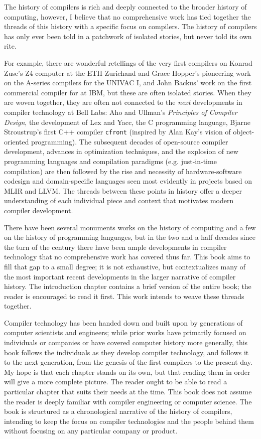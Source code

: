 
The history of compilers is rich and deeply connected to the broader history of
computing, however, I believe that no comprehensive work has tied together the
threads of this history with a specific focus on compilers.
The history of compilers has only ever been told in a patchwork of isolated stories,
but never told its own rite.

For example, there are wonderful
retellings of the very first compilers on Konrad Zuse's Z4 computer at the ETH
Zurichand and Grace Hopper's pioneering work on the A-series compilers for the
UNIVAC I, and John Backus' work on the first commercial compiler for \FTN{}
at IBM, but these are often isolated stories. When they are woven together, they
are often not connected to the \textit{next}
developments in compiler technology at Bell Labs: Aho and Ullman's
\textit{Principles of Compiler Design}, the development of Lex and Yacc, the C
programming language, Bjarne Stroustrup's first C++ compiler \texttt{cfront}
(inspired by Alan Kay's vision of object-oriented programming). The subsequent
decades of open-source compiler development, advances in optimization
techniques, and the explosion of new programming languages and compilation
paradigms (e.g. just-in-time compilation) are then followed by the rise and
necessity of hardware-software codesign and domain-specific languages seen most
evidently in projects based on MLIR and LLVM. The threads between these points
in history offer a deeper understanding of each individual piece and context
that motivates modern compiler development.

There have been several
monuments works on the history of computing and a few on the history of
programming languages, but in the two and a half decades since the turn of the
century there have been ample developments in compiler technology that no
comprehensive work has covered thus far. This book aims to fill that gap to a
small degree; it is not exhaustive, but contextualizes many of the most
important recent developments in the larger narrative of compiler history.
The introduction chapter contains a brief version of the entire book; the
reader is encouraged to read it first. This work intends to weave these threads
together.

Compiler technology has been handed down and built upon by generations
of computer scientists and engineers; while prior works have primarily focused
on individuals or companies or have covered computer history more generally, this
book follows the individuals as they develop compiler technology, and follows it
to the next generation, from the genesis of the first compilers to the present
day. My hope is that each chapter stands on its own, but that reading them in
order will give a more complete picture. The reader ought to be able to read a
particular chapter that suits their needs at the time. This book does not assume
the reader is deeply familiar with compiler engineering or computer science. The
book is structured as a chronological narrative of the history of
compilers, intending to keep the focus on compiler technologies and the people
behind them without focusing on any particular company or product.
